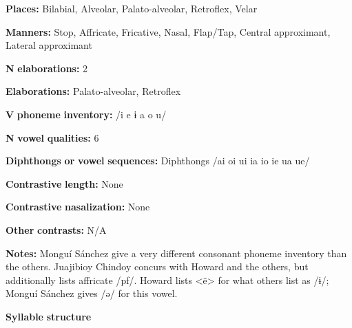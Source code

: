 \documentclass[output=paper]{langsci/langscibook}
\begin{document}
\begin{styleBody}
\textbf{Places:} Bilabial, Alveolar, Palato-alveolar, Retroflex, Velar
\end{styleBody}

\begin{styleBody}
\textbf{Manners:} Stop, Affricate, Fricative, Nasal, Flap/Tap, Central approximant, Lateral approximant
\end{styleBody}

\begin{styleBody}
\textbf{N} \textbf{elaborations:} 2
\end{styleBody}

\begin{styleBody}
\textbf{Elaborations:} Palato-alveolar, Retroflex
\end{styleBody}

\begin{styleBody}
\textbf{V} \textbf{phoneme} \textbf{inventory:} /i e ɨ a o u/
\end{styleBody}

\begin{styleBody}
\textbf{N} \textbf{vowel} \textbf{qualities:} 6
\end{styleBody}

\begin{styleBody}
\textbf{Diphthongs} \textbf{or} \textbf{vowel} \textbf{sequences:} Diphthongs /ai oi ui ia io ie ua ue/
\end{styleBody}

\begin{styleBody}
\textbf{Contrastive} \textbf{length:} None
\end{styleBody}

\begin{styleBody}
\textbf{Contrastive} \textbf{nasalization:} None
\end{styleBody}

\begin{styleBody}
\textbf{Other} \textbf{contrasts:} N/A
\end{styleBody}

\begin{styleBody}
\textbf{Notes:} Monguí Sánchez give a very different consonant phoneme inventory than the others. Juajibioy Chindoy concurs with Howard and the others, but additionally lists affricate /pf/. Howard lists <ë> for what others list as /ɨ/; Monguí Sánchez gives /ə/ for this vowel.
\end{styleBody}

\begin{styleBody}
\textbf{Syllable} \textbf{structure}
\end{styleBody}
\end{document}
